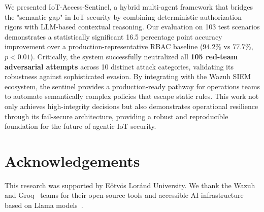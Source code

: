\documentclass[conference]{IEEEtran}
\begin{document}
We presented IoT-Access-Sentinel, a hybrid multi-agent framework that bridges the "semantic gap" in IoT security by combining deterministic authorization rigors with LLM-based contextual reasoning. Our evaluation on 103 test scenarios demonstrates a statistically significant 16.5 percentage point accuracy improvement over a production-representative RBAC baseline (94.2\% vs 77.7\%, $p < 0.01$). Critically, the system successfully neutralized all \textbf{105 red-team adversarial attempts} across 10 distinct attack categories, validating its robustness against sophisticated evasion. By integrating with the Wazuh SIEM ecosystem, the sentinel provides a production-ready pathway for operations teams to automate semantically complex policies that escape static rules. This work not only achieves high-integrity decisions but also demonstrates operational resilience through its fail-secure architecture, providing a robust and reproducible foundation for the future of agentic IoT security.

\section*{Acknowledgements}

This research was supported by Eötvös Loránd University. We thank the Wazuh~\cite{wazuh2024} and Groq~\cite{groq2024} teams for their open-source tools and accessible AI infrastructure based on Llama models~\cite{touvron2023llama}.



\end{document}
